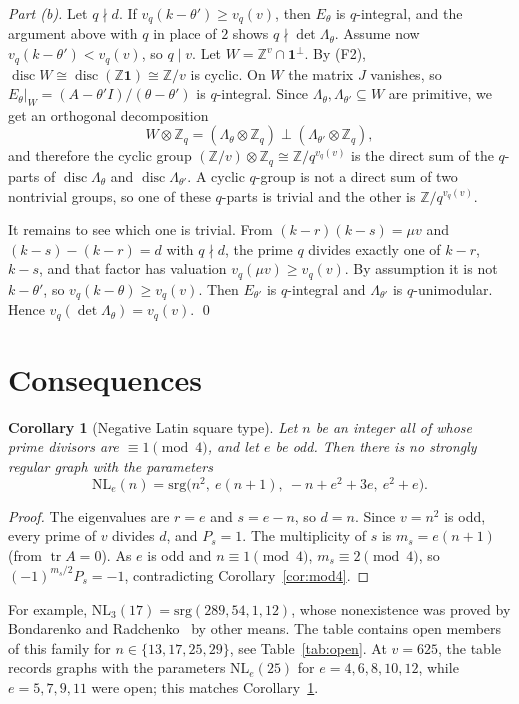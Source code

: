 \documentclass[11pt]{amsart}
\newtheorem{corollary}[theorem]{Corollary}
\theoremstyle{remark}
\newcommand{\Z}{\mathbb{Z}}
\DeclareMathOperator{\disc}{disc}
\begin{document}
\emph{Part (b).} Let $q\nmid d$. If $v_q(k-\theta')\ge v_q(v)$, then $E_\theta$ is $q$-integral, and the argument above
with $q$ in place of $2$ shows $q\nmid\det\Lambda_\theta$. Assume now $v_q(k-\theta')<v_q(v)$, so $q\mid v$. Let
$W=\Z^v\cap\mathbf 1^\perp$. By (F2), $\disc W\cong\disc(\Z\mathbf 1)\cong\Z/v$ is cyclic. On $W$ the matrix $J$
vanishes, so $E_\theta|_W=(A-\theta'I)/(\theta-\theta')$ is $q$-integral. Since $\Lambda_\theta,\Lambda_{\theta'}\subseteq W$
are primitive, we get an orthogonal decomposition
\[
W\otimes\Z_q=(\Lambda_\theta\otimes\Z_q)\perp(\Lambda_{\theta'}\otimes\Z_q),
\]
and therefore the cyclic group $(\Z/v)\otimes\Z_q\cong\Z/q^{v_q(v)}$ is the direct sum of the $q$-parts of
$\disc\Lambda_\theta$ and $\disc\Lambda_{\theta'}$. A cyclic $q$-group is not a direct sum of two nontrivial groups, so
one of these $q$-parts is trivial and the other is $\Z/q^{v_q(v)}$.

It remains to see which one is trivial. From $(k-r)(k-s)=\mu v$ and $(k-s)-(k-r)=d$ with $q\nmid d$, the prime $q$ divides
exactly one of $k-r$, $k-s$, and that factor has valuation $v_q(\mu v)\ge v_q(v)$. By assumption it is not $k-\theta'$, so
$v_q(k-\theta)\ge v_q(v)$. Then $E_{\theta'}$ is $q$-integral and $\Lambda_{\theta'}$ is $q$-unimodular. Hence
$v_q(\det\Lambda_\theta)=v_q(v)$. \qed

\section{Consequences}
\begin{corollary}[Negative Latin square type]\label{cor:NL}
Let $n$ be an integer all of whose prime divisors are $\equiv1\pmod4$, and let $e$ be odd. Then there is no
strongly regular graph with the parameters
\[
\mathrm{NL}_e(n)=\mathrm{srg}\big(n^2,\ e(n+1),\ -n+e^2+3e,\ e^2+e\big).
\]
\end{corollary}
\begin{proof}
The eigenvalues are $r=e$ and $s=e-n$, so $d=n$. Since $v=n^2$ is odd, every prime of $v$ divides $d$, and
$P_s=1$. The multiplicity of $s$ is $m_s=e(n+1)$ (from $\operatorname{tr}A=0$). As $e$ is odd and $n\equiv1\pmod 4$,
$m_s\equiv2\pmod4$, so $(-1)^{m_s/2}P_s=-1$, contradicting Corollary~\ref{cor:mod4}.
\end{proof}

For example, $\mathrm{NL}_3(17)=\mathrm{srg}(289,54,1,12)$, whose nonexistence was proved by Bondarenko and
Radchenko~\cite{BR} by other means. The table contains open members of this family for
$n\in\{13,17,25,29\}$, see Table~\ref{tab:open}. At $v=625$, the table records graphs with the parameters $\mathrm{NL}_e(25)$ for $e=4,6,8,10,12$, while
$e=5,7,9,11$ were open; this matches Corollary~\ref{cor:NL}.
\end{document}
